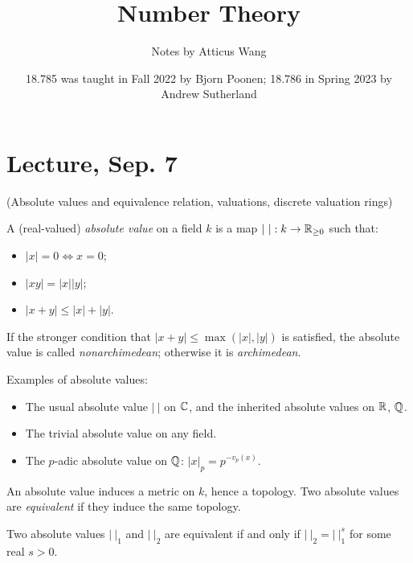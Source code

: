 \documentclass[11pt]{amsart}
\title{Number Theory}
\author{Notes by Atticus Wang}
\date{18.785 was taught in Fall 2022 by Bjorn Poonen; 18.786 in Spring 2023 by Andrew Sutherland}
\begin{document}
\maketitle


\setcounter{tocdepth}{1}
\begin{multicols}{2}
\tableofcontents
\end{multicols}

\newpage

\section{Lecture, Sep. 7}

(Absolute values and equivalence relation, valuations, discrete valuation rings)

\begin{defn}
A (real-valued) \emph{absolute value} on a field $k$ is a map $|\ |: k \to \mathbb{R}_{\ge 0}$ such that:
\begin{itemize}
    \item $|x| = 0 \iff x = 0$;
    \item $|xy| = |x||y|$;
    \item $|x+y| \le |x| + |y|$.
\end{itemize}
If the stronger condition that $|x+y| \le \max(|x|,|y|)$ is satisfied, the absolute value is called \emph{nonarchimedean}; otherwise it is \emph{archimedean}.
\end{defn}

Examples of absolute values:
\begin{itemize}
    \item The usual absolute value $|\ |$ on $\mathbb{C}$, and the inherited absolute values on $\mathbb{R}$, $\mathbb{Q}$.
    \item The trivial absolute value on any field.
    \item The $p$-adic absolute value on $\mathbb{Q}$: $|x|_p = p^{-v_p(x)}$.
\end{itemize}

An absolute value induces a metric on $k$, hence a topology. Two absolute values are \emph{equivalent} if they induce the same topology. 

\begin{prop}
Two absolute values $|\ |_1$ and $|\ |_2$ are equivalent if and only if $|\ |_2 = |\ |_1^s$ for some real $s>0$.
\end{prop}
\end{document}

